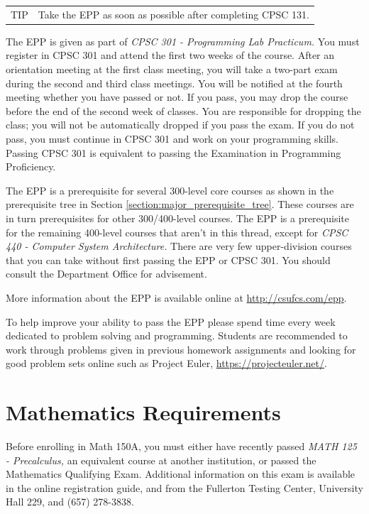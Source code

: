 \documentclass{book}
\newenvironment{tip}{
  \tcolorbox \begin{tabular}{m{.5in} m{5.25in}}
    \Large{TIP} &
}{
  \end{tabular} \endtcolorbox
}
\newcommand{\shrunkurl}[1]{\url{http://csufcs.com/#1}}
\begin{document}
\begin{tip}
  Take the EPP as soon as possible after completing CPSC 131.
\end{tip}

The EPP is given as part of \emph{CPSC 301 - Programming Lab
  Practicum.} You must register in CPSC 301 and attend the first two
weeks of the course. After an orientation meeting at the first class
meeting, you will take a two-part exam during the second and third
class meetings. You will be notified at the fourth meeting whether you
have passed or not. If you pass, you may drop the course before the
end of the second week of classes. You are responsible for dropping
the class; you will not be automatically dropped if you pass the
exam. If you do not pass, you must continue in CPSC 301 and work on
your programming skills. Passing CPSC 301 is equivalent to passing the
Examination in Programming Proficiency.

The EPP is a prerequisite for several 300-level core courses as shown
in the prerequisite tree in Section
\ref{section:major_prerequisite_tree}. These courses are in turn
prerequisites for other 300/400-level courses. The EPP is a
prerequisite for the remaining 400-level courses that aren’t in this
thread, except for \emph{CPSC 440 - Computer System Architecture.}
There are very few upper-division courses that you can take without
first passing the EPP or CPSC 301. You should consult the Department
Office for advisement.

More information about the EPP is available online at \shrunkurl{epp}.

To help improve your ability to pass the EPP please spend time every
week dedicated to problem solving and programming. Students are
recommended to work through problems given in previous homework
assignments and looking for good problem sets online such as Project
Euler, \url{https://projecteuler.net/}.

\section{Mathematics Requirements}

Before enrolling in Math 150A, you must either have recently passed
\emph{MATH 125 - Precalculus,} an equivalent course at another
institution, or passed the Mathematics Qualifying Exam. Additional
information on this exam is available in the online registration
guide, and from the Fullerton Testing Center, University Hall 229, and
(657) 278-3838.
\end{document}
